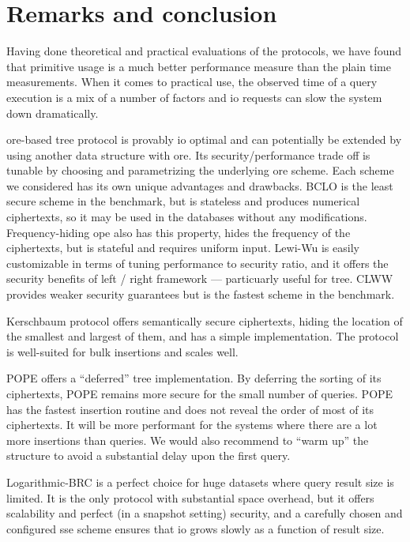 \section{Remarks and conclusion}\label{section:range-snapshot:conclusion}

	Having done theoretical and practical evaluations of the protocols, we have found that primitive usage is a much better performance measure than the plain time measurements.
	When it comes to practical use, the observed time of a query execution is a mix of a number of factors and \acrshort{io} requests can slow the system down dramatically.

	\acrshort{ore}-based {\BPlus} tree protocol is provably \acrshort{io} optimal and can potentially be extended by using another data structure with \acrshort{ore}.
	Its security/performance trade off is tunable by choosing and parametrizing the underlying \acrshort{ore} scheme.
	Each scheme we considered has its own unique advantages and drawbacks.
	BCLO \cite{bclo-ope} is the least secure scheme in the benchmark, but is stateless and produces numerical ciphertexts, so it may be used in the databases without any modifications.
	Frequency-hiding \acrshort{ope} \cite{fh-ope} also has this property, hides the frequency of the ciphertexts, but is stateful and requires uniform input.
	Lewi-Wu \cite{lewi-wu-ore} is easily customizable in terms of tuning performance to security ratio, and it offers the security benefits of left / right framework --- particuarly useful for {\BPlus} tree.
	CLWW \cite{clww-ore} provides weaker security guarantees but is the fastest scheme in the benchmark.

	Kerschbaum protocol \cite{florian-protocol} offers semantically secure ciphertexts, hiding the location of the smallest and largest of them, and has a simple implementation.
	The protocol is well-suited for bulk insertions and scales well.

	\balance%

	POPE \cite{pope} offers a ``deferred'' {\BPlus} tree implementation.
	By deferring the sorting of its ciphertexts, POPE remains more secure for the small number of queries.
	POPE has the fastest insertion routine and does not reveal the order of most of its ciphertexts.
	It will be more performant for the systems where there are a lot more insertions than queries.
	We would also recommend to ``warm up'' the structure to avoid a substantial delay upon the first query.

	Logarithmic-BRC is a perfect choice for huge datasets where query result size is limited.
	It is the only protocol with substantial space overhead, but it offers scalability and perfect (in a snapshot setting) security,
	and a carefully chosen and configured \acrshort{sse} scheme ensures that \acrshort{io} grows slowly as a function of result size.

